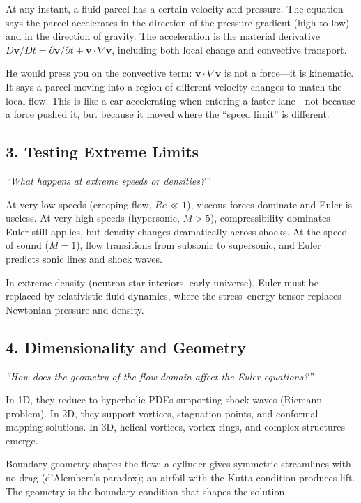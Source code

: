 \documentclass[11pt,openright]{book}
\begin{document}
At any instant, a fluid parcel has a certain velocity and pressure. The equation says the parcel accelerates in the direction of the pressure gradient (high to low) and in the direction of gravity. The acceleration is the material derivative $D\mathbf{v}/Dt = \partial\mathbf{v}/\partial t + \mathbf{v} \cdot \nabla\mathbf{v}$, including both local change and convective transport.

He would press you on the convective term: $\mathbf{v} \cdot \nabla\mathbf{v}$ is not a force---it is kinematic. It says a parcel moving into a region of different velocity changes to match the local flow. This is like a car accelerating when entering a faster lane---not because a force pushed it, but because it moved where the ``speed limit'' is different.

\subsection*{3. Testing Extreme Limits}
\textit{``What happens at extreme speeds or densities?''}

At very low speeds (creeping flow, $Re \ll 1$), viscous forces dominate and Euler is useless. At very high speeds (hypersonic, $M > 5$), compressibility dominates---Euler still applies, but density changes dramatically across shocks. At the speed of sound ($M = 1$), flow transitions from subsonic to supersonic, and Euler predicts sonic lines and shock waves.

In extreme density (neutron star interiors, early universe), Euler must be replaced by relativistic fluid dynamics, where the stress--energy tensor replaces Newtonian pressure and density.

\subsection*{4. Dimensionality and Geometry}
\textit{``How does the geometry of the flow domain affect the Euler equations?''}

In 1D, they reduce to hyperbolic PDEs supporting shock waves (Riemann problem). In 2D, they support vortices, stagnation points, and conformal mapping solutions. In 3D, helical vortices, vortex rings, and complex structures emerge.

Boundary geometry shapes the flow: a cylinder gives symmetric streamlines with no drag (d'Alembert's paradox); an airfoil with the Kutta condition produces lift. The geometry is the boundary condition that shapes the solution.
\end{document}
